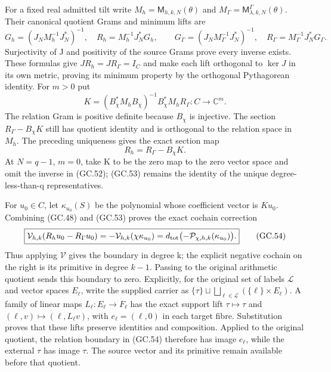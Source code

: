 \documentclass[11pt]{article}
\begin{document}
For a fixed real admitted tilt write $M_h=\mathsf M_{h,k,N}(\theta)$
and $M_\Gamma=\mathsf M_{\lambda,k,N}^\Gamma(\theta)$.
Their canonical quotient Grams and minimum lifts are
\[
 G_h=(J_NM_h^{-1}J_N^*)^{-1},\quad
 R_h=M_h^{-1}J_N^*G_h,
\qquad
 G_\Gamma=(J_NM_\Gamma^{-1}J_N^*)^{-1},\quad
 R_\Gamma=M_\Gamma^{-1}J_N^*G_\Gamma.                           \tag{GC.51}
\]
Surjectivity of J and positivity of the source Grams prove every
inverse exists. These formulas give $JR_h=JR_\Gamma=I_C$ and
make each lift orthogonal to $\ker J$ in its own metric, proving
its minimum property by the orthogonal Pythagorean identity.
For $m>0$ put
\[
 K=(B_\chi^*M_hB_\chi)^{-1}B_\chi^*M_hR_\Gamma:
                         C\longrightarrow\mathbb C^m.
                                                               \tag{GC.52}
\]
The relation Gram is positive definite because $B_\chi$ is
injective. The section $R_\Gamma-B_\chi K$ still has quotient
identity and is orthogonal to the relation space in $M_h$.
The preceding uniqueness gives the exact section map
\[
 \boxed{R_h=R_\Gamma-B_\chi K.}                               \tag{GC.53}
\]
At $N=q-1$, $m=0$, take K to be the zero map to the zero vector
space and omit the inverse in (GC.52); (GC.53) remains the identity
of the unique degree-less-than-q representatives.

For $u_0\in C$, let $\kappa_{u_0}(S)$ be the polynomial whose
coefficient vector is $Ku_0$. Combining (GC.48) and (GC.53) proves
the exact cochain correction
\[
 \boxed{\mathcal V_{h,k}(R_hu_0-R_\Gamma u_0)
  =-\mathcal V_{h,k}(\chi\kappa_{u_0})
  =d_{\rm tot}\bigl(-\mathcal P_{\chi,h,k}(\kappa_{u_0})\bigr).}
                                                               \tag{GC.54}
\]
Thus applying $\mathcal V$ gives the boundary in degree k; the
explicit negative cochain on the right is its primitive in degree
$k-1$. Passing to the original arithmetic quotient sends this
boundary to zero. Explicitly, for the original set of labels
$\mathcal L$ and vector spaces $E_\ell$, write the supplied carrier
as $\{\tau\}\sqcup\bigsqcup_{\ell\in\mathcal L}(\{\ell\}\times E_\ell)$.
A family of linear maps $L_\ell:E_\ell\to F_\ell$ has the exact
support lift $\tau\mapsto\tau$ and
$(\ell,v)\mapsto(\ell,L_\ell v)$, with
$e_\ell=(\ell,0)$ in each target fibre. Substitution proves that
these lifts preserve identities and composition. Applied to the
original quotient, the relation boundary in (GC.54) therefore has
image $e_\ell$, while the external $\tau$ has image $\tau$.
The source vector and its primitive remain available before that
quotient.
\end{document}
